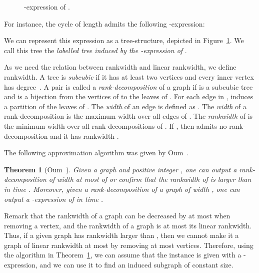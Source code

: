 \documentclass[11pt]{article}
\newtheorem{theorem}{Theorem}[section]
\theoremstyle{remark}
\begin{document}
\begin{figure}\center
{}
\caption{-expression of .} 	\label{fig:c5expression}
\end{figure}

For instance, the cycle  of length  admits the following -expression:

We can represent this expression as a tree-structure, depicted in Figure~\ref{fig:c5expression}.
We call this tree the \emph{labelled tree induced by the -expression of }.

As we need the relation between rankwidth and linear rankwidth, we define rankwidth.
A tree is \emph{subcubic} if it has at least two vertices and every inner vertex has degree~. A pair  is called a \emph{rank-decomposition} of a graph  if  is a subcubic tree and  is a bijection from the vertices of  to the leaves of . For each edge  in ,  induces a partition  of the leaves of . The \emph{width} of an edge  is defined as . The \emph{width} of a rank-decomposition  is the maximum width over all edges of . The \emph{rankwidth} of  is the minimum width over all rank-decompositions of . If , then  admits no rank-decomposition and it has rankwidth .

The following approximation algorithm was given by Oum~\cite{Oum2006, OS2004}. 

\begin{theorem}[Oum~\cite{Oum2006, OS2004}]\label{thm:approxcw}
Given a graph  and positive integer , 
one can output a rank-decomposition of width at most  of  or confirm that the rankwidth of  is larger than  in time .
Moreover, given a rank-decomposition of a graph  of width , 
one can output a -expression of  in time .
\end{theorem}
Remark that the rankwidth of a graph can be decreased by at most  when removing a vertex, 
and the rankwidth of a graph is at most its linear rankwidth.
Thus, if a given graph has rankwidth larger than , then we cannot make it a graph of linear rankwidth at most  by removing at most  vertices.
Therefore, using the algorithm in Theorem~\ref{thm:approxcw}, we can assume that the instance is given with a -expression, and we can use it to find an induced subgraph of constant size. 
\end{document}

